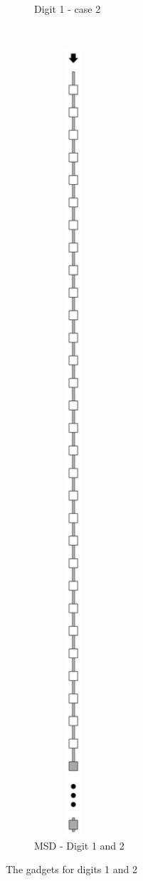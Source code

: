 \begin{figure}[H]
\begin{subfigure}[t]{0.32\textwidth}
        \caption{\label{fig:return_from_digit_1_op_msr} Digit 1 - case 2}
    \end{subfigure}%
    ~
    \begin{subfigure}[t]{0.32\textwidth}
        \centering
        \includegraphics[width=0.32\textwidth]{return_paths_return_from_digit_1-or-2_op_msr_msd}
        \caption{\label{fig:return_from_digit_1or2_op_msr_msd} MSD - Digit 1 and 2 }
    \end{subfigure}%
    \caption{\label{fig:return_from_digits} The {\returnfromdigit} gadgets for digits 1 and 2}
\end{figure}

